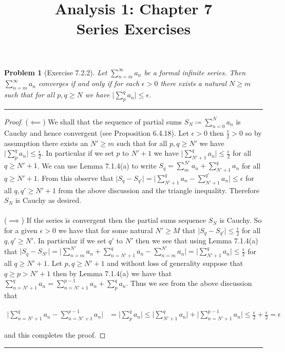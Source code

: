 \documentclass{article}
\title{\huge Analysis 1: Chapter 7 \\ \LARGE {Series Exercises}}
\date{}
\newcommand{\lined}{\noindent\rule{\textwidth}{1pt}}
\newtheorem*{problem}{Problem}
\begin{document}
	\maketitle
	
	\begin{problem}[Exercise 7.2.2] Let $\sum_{n=m}^\infty a_n$ be a formal infinite series. Then $\sum_{n=m}^\infty a_n$ converges if and only if for each $\epsilon > 0$ there exists a natural $N \geq m$ such that for all $p,q \geq N$ we have $\lvert \sum_{p}^q a_n \rvert \leq\epsilon$.
	\end{problem}
	
	\lined
	\begin{proof}
	($\impliedby$) We shall that the sequence of partial sums $S_N \coloneqq \sum_{n=0}^N a_n$ is Cauchy and hence convergent (see Proposition 6.4.18).
	Let $\epsilon > 0$ then $\frac{\epsilon}{2} > 0$ so by assumption there exists an $N' \geq m$ such that for all $p,q \geq N'$ we have $\lvert \sum_{p}^q a_n \rvert \leq \frac{\epsilon}{2}$. In particular if we set $p$ to $N' + 1$ we have $\lvert \sum_{N'+1}^q a_n \rvert \leq \frac{\epsilon}{2}$ for all $q \geq N'+1$. We can use Lemma 7.1.4(a) to write $S_q = \sum_{m}^{N'} a_n + \sum_{N'+1}^q a_n$ for all $q \geq N'+1$. From this observe that $\lvert S_q - S_{q'} \rvert = \lvert  \sum_{N'+1}^q a_n -  \sum_{N'+1}^{q'} a_n \rvert \leq \epsilon$ for all $q,q' \geq N'+1$ from the above discussion and the triangle inequality. Therefore $S_N$ is Cauchy as desired. \paragraph{} \noindent
	\noindent ($\implies$)
	If the series is convergent then the partial sums sequence $S_N$ is Cauchy. So for a given $\epsilon > 0$ we have that for some natural $N' \geq M$ that $\lvert S_q - S_{q'} \rvert \leq \frac{\epsilon}{2}$ for all $q,q' \geq N'$. In particular if we set $q'$ to $N'$ then we see that using Lemma 7.1.4(a) that $\lvert S_q - S_{N'} \rvert = \lvert \sum_{n=m}^{N'} a_n + \sum_{n=N'+1}^q a_n - \sum_{n=m}^{N'} a_n \rvert  = \lvert \sum_{N'+1}^q a_n \rvert \leq \frac{\epsilon}{2}$ for all $q \geq N' + 1$. Let $p,q \geq N'+1$ and without loss of generality suppose that $q \geq p > N' + 1$ then by Lemma 7.1.4(a) we have that $\sum_{n = N' + 1}^q a_n = \sum_{n = N'+1}^{p-1} a_n + \sum_{p}^{q} a_n$. Thus we see from the above discussion that 
	
	\begin{align*}
\lvert \sum_{n = N' + 1}^q a_n - \sum_{n = N'+1}^{p-1} a_n \rvert  & = \lvert  \sum_{p}^{q} a_n \rvert \leq \lvert \sum_{N' + 1}^q a_n \rvert + \lvert \sum_{n = N' +1 }^{p-1} a_n \rvert  \leq \frac{\epsilon}{2} + \frac{\epsilon}{2} = \epsilon
\end{align*}

and this completes the proof.

	\end{proof}
	\lined
\end{document}
